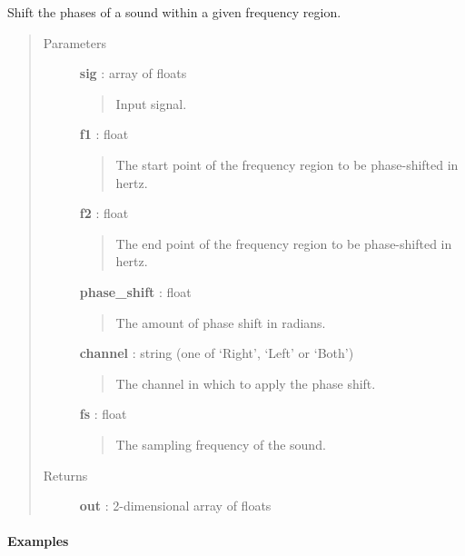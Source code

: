 \documentclass[a4paper,12pt,english]{sphinxmanual}
\begin{document}
\begin{fulllineitems}
\label{sndlib:sndlib.phaseShift}
Shift the phases of a sound within a given frequency region.
\begin{quote}\begin{description}
\item[{Parameters }] \leavevmode
\textbf{sig} : array of floats
\begin{quote}

Input signal.
\end{quote}

\textbf{f1} : float
\begin{quote}

The start point of the frequency region to be
phase-shifted in hertz.
\end{quote}

\textbf{f2} : float
\begin{quote}

The end point of the frequency region to be
phase-shifted in hertz.
\end{quote}

\textbf{phase\_shift} : float
\begin{quote}

The amount of phase shift in radians.
\end{quote}

\textbf{channel} : string (one of `Right', `Left' or `Both')
\begin{quote}

The channel in which to apply the phase shift.
\end{quote}

\textbf{fs} : float
\begin{quote}

The sampling frequency of the sound.
\end{quote}

\item[{Returns }] \leavevmode
\textbf{out} : 2-dimensional array of floats

\end{description}\end{quote}
\paragraph{Examples}


\end{fulllineitems}
\end{document}
